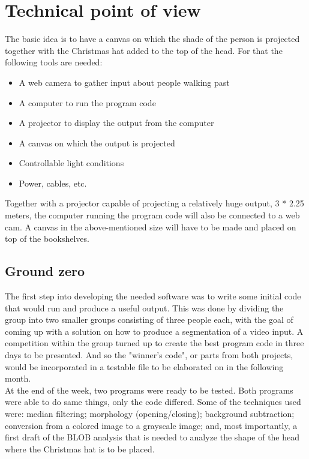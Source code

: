 \section{Technical point of view}
The basic idea is to have a canvas on which the shade of the person is projected together with the Christmas hat added to the top of the head. For that the following tools are needed:

\begin{itemize}
\item A web camera to gather input about people walking past
\item A computer to run the program code
\item A projector to display the output from the computer
\item A canvas on which the output is projected
\item Controllable light conditions
\item Power, cables, etc.
\end{itemize}

Together with a projector capable of projecting a relatively huge output, 3 * 2.25 meters, the computer running the program code will also be connected to a web cam. A canvas in the above-mentioned size will have to be made and placed on top of the bookshelves.

\subsection{Ground zero}
The first step into developing the needed software was to write some initial code that would run and produce a useful output. This was done by dividing the group into two smaller groups consisting of three people each, with the goal of coming up with a solution on how to produce a segmentation of a video input. A competition within the group turned up to create the best program code in three days to be presented. And so the "winner's code", or parts from both projects, would be incorporated in a testable file to be elaborated on in the following month.\\
At the end of the week, two programs were ready to be tested. Both programs were able to do same things, only the code differed. Some of the techniques used were: median filtering; morphology (opening/closing); background subtraction; conversion from a colored image to a grayscale image; and, most importantly, a first draft of the BLOB analysis that is needed to analyze the shape of the head where the Christmas hat is to be placed.\\

